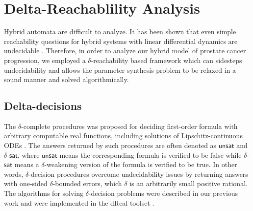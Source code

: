 \section{Delta-Reachablility Analysis}



Hybrid automata are difficult to analyze. It has been shown that even simple reachability questions for hybrid 
systems with linear differential dynamics are undecidable \citep{henzinger96}. Therefore, in order to analyze our hybrid model of prostate cancer progression, we employed a $\delta$-reachability based framework \cite{liu14} which can sidesteps undecidability and allows the parameter synthesis problem to be relaxed in a sound manner and solved algorithmically. 

\subsection{Delta-decisions}
The $\delta$-complete procedures \cite{gao12a} was proposed for deciding first-order formula with arbitrary computable real functions, including solutions of Lipschitz-continuous ODEs \citep{gao12b}. The answers returned by such procedures are often denoted as $\mathsf{unsat}$ and $\delta$-$\mathsf{sat}$, where $\mathsf{unsat}$ means the corresponding formula is verified to be false while $\delta$-$\mathsf{sat}$ means a $\delta$-weakening version of the formula is verified to be true. In other words, $\delta$-decision procedures overcome undecidability issues by returning answers with one-sided $\delta$-bounded errors, which $\delta$ is an arbitrarily small positive rational. The algorithms for solving $\delta$-decision problems were described in our previous work\cite{gao12a,gao12b,gao13} and were implemented in the dReal toolset \cite{dreal}. 

